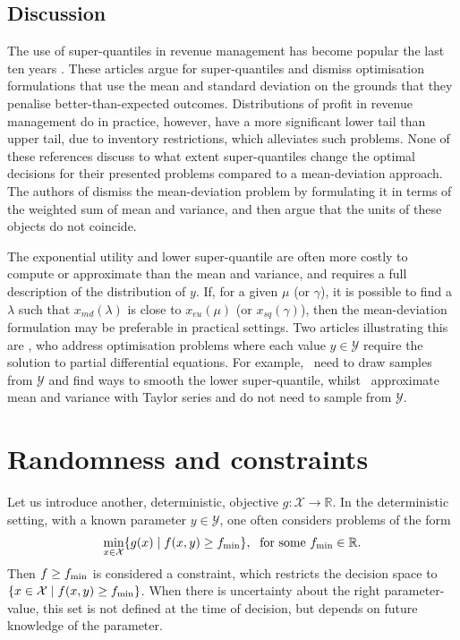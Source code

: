\documentclass[main.tex]{subfiles}
\begin{document}
\subsection{Discussion}
The use of super-quantiles in revenue management has become popular
the last ten years
\citep{wu2014risk,xue2015optimal,zhou2008optimal,ahmed2007coherent}.
These articles argue for super-quantiles and dismiss
optimisation formulations that use the mean and standard deviation
on the grounds that they penalise better-than-expected outcomes.
Distributions of profit in revenue management do in practice, however,
have a more significant lower tail than upper tail, due to inventory
restrictions, which alleviates such problems.
None of these references discuss to what extent super-quantiles change the
optimal decisions for their presented problems compared to a
mean-deviation approach.
The authors of \citep{choi2011multiproduct}
dismiss the mean-deviation
problem by formulating it in terms of the weighted sum of mean and
variance, and then argue that the units of these objects do not
coincide.

The exponential utility and lower super-quantile are often more costly
to compute or approximate than the mean and variance, and requires a
full description of the distribution of $y$. If, for a given $\mu$ (or
$\gamma$), it is possible to find a $\lambda$ such that
$x_{md}(\lambda)$ is close to $x_{eu}(\mu)$ (or $x_{sq}(\gamma)$), then the
mean-deviation formulation may be preferable in practical settings.
Two articles illustrating this are
\citep{kouri2016risk,alexanderian2017mean}, who address optimisation problems
where each value $y\in\mathcal{Y}$ require the solution to partial
differential equations.
For example,~\cite{kouri2016risk}
need to draw samples from $\mathcal{Y}$ and find ways to smooth the lower super-quantile,
whilst~\cite{alexanderian2017mean} approximate mean and variance
with Taylor series and do not need to sample from $\mathcal{Y}$.


\section{Randomness and constraints}
Let us introduce another, deterministic, objective $g:\mathcal
X\to\mathbb{R}$. In the deterministic setting, with a known parameter
$y\in\mathcal{Y}$, one often considers problems of the form
\begin{align}
  \min_{x\in\mathcal{X}}\{g(x)\mid f(x,y)\geq f_{\textnormal{min}} \},\;
  \text{ for some } f_{\textnormal{min}}\in\mathbb{R}.
\end{align}
Then $f\geq f_{\textnormal{min}}$ is considered a constraint, which restricts the
decision space to $\{x\in\mathcal{X}\mid f(x,y)\geq f_{\textnormal{min}}\}$.
When there is uncertainty about the right parameter-value, this set is
not defined at the time of decision, but depends on future knowledge
of the parameter.
\end{document}
